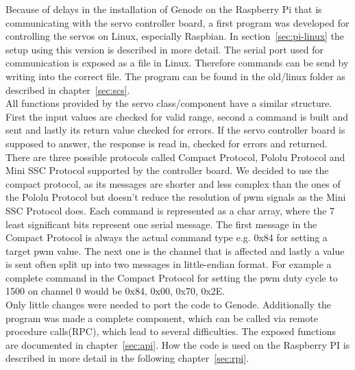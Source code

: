 Because of delays in the installation of Genode on the Raspberry Pi that is communicating with the servo controller board, a first program was developed for controlling the servos on Linux, especially Raspbian. In section~\ref{sec:pi-linux} the setup using this version is described in more detail. The serial port used for communication is exposed as a file in Linux. Therefore commands can be send by writing into the correct file. The program can be found in the old/linux folder as described in chapter~\ref{sec:scs}.\\

All functions provided by the servo class/component have a similar structure. First the input values are checked for valid range, second a command is built and sent and lastly its return value checked for errors. If the servo controller board is supposed to answer, the response is read in, checked for errors and returned. There are three possible protocols called Compact Protocol, Pololu Protocol and Mini SSC Protocol supported by the controller board. We decided to use the compact protocol, as its messages are shorter and less complex than the ones of the Pololu Protocol but doesn't reduce the resolution of pwm signals as the Mini SSC Protocol does. Each command is represented as a char array, where the 7 least significant bits represent one serial message. The first message in the Compact Protocol is always the actual command type e.g. 0x84 for setting a target pwm value. The next one is the channel that is affected and lastly a value is sent often split up into two messages in little-endian format. For example a complete command in the Compact Protocol for setting the pwm duty cycle to 1500 on channel 0 would be 0x84, 0x00, 0x70, 0x2E.\\

Only little changes were needed to port the code to Genode. Additionally the program was made a complete component, which can be called via remote procedure calls(RPC), which lead to several difficulties. The exposed functions are documented in chapter~\ref{sec:api}. How the code is used on the Raspberry PI is described in more detail in the following chapter~\ref{sec:rpi}.